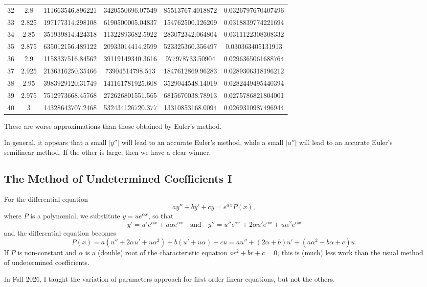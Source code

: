 \documentclass{article}
\begin{document}
\begin{table}
\begin{tabular}{S[table-format=2] S[table-format=1.3] S[table-format=11] S[table-format=12] S[table-format=11] S[table-format=1.9]}
32 & 2.8 & 111663546.896221 & 3420550696.07549 & 85513767.4018872 & 0.0326797670407496 \\
33 & 2.825 & 197177314.298108 & 6190500005.04837 & 154762500.126209 & 0.0318839774221694 \\
34 & 2.85 & 351939814.424318 & 11322893682.5922 & 283072342.064804 & 0.0311122308308332 \\
35 & 2.875 & 635012156.489122 & 20933014414.2599 & 523325360.356497 & 0.030363405131913 \\
36 & 2.9 & 1158337516.84562 & 39119149340.3616 & 977978733.50904 & 0.0296365061688764 \\
37 & 2.925 & 2136316250.35466 & 73904514798.513 & 1847612869.96283 & 0.0289306318196212 \\
38 & 2.95 & 3983929120.31749 & 141161781925.608 & 3529044548.14019 & 0.0282449495440394 \\
39 & 2.975 & 7512973668.45768 & 272626801551.565 & 6815670038.78913 & 0.0275786821804001 \\
40 & 3 & 14328643707.2468 & 532434126720.377 & 13310853168.0094 & 0.0269310987496944 \\
\bottomrule
\end{tabular}
\end{table}
These are worse approximations than those obtained by Euler's method.

In general, it appears that a small $\lvert y''\rvert$ will lead to an accurate Euler's method, while a small $\lvert u''\rvert$ will lead to an accurate Euler's semilinear method.  If the other is large, then we have a clear winner.

\setcounter{section}{5}
\setcounter{subsection}{3}

\subsection{The Method of Undetermined Coefficients I}

For the differential equation
\[ay''+by'+cy=e^{\alpha x}P(x),\]
where $P$ is a polynomial, we substitute $y=ue^{\alpha x}$, so that
\[y'=u'e^{\alpha x}+u\alpha e^{\alpha x}\quad\text{and}\quad y''=u''e^{\alpha x}+2\alpha u'e^{\alpha x}+u\alpha^2e^{\alpha x}\]
and the differential equation becomes
\[P(x)=a(u''+2\alpha u'+u\alpha^2)+b(u'+u\alpha)+cu=au''+(2\alpha+b)u'+(a\alpha^2+b\alpha+c)u.\]
If $P$ is non-constant and $\alpha$ is a (double) root of the characteristic equation $ar^2+br+c=0$, this is (much) less work than the usual method of undetermined coefficients.\bigskip

In Fall 2026, I taught the variation of parameters approach for first order linear equations, but not the others.
\end{document}
